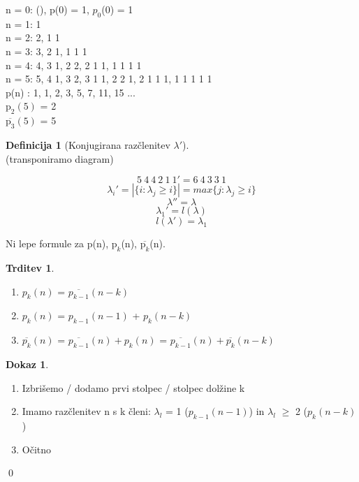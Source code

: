 \documentclass[a4paper,12pt]{article}
\theoremstyle{definition}
\newtheorem{defn}[counter]{Definicija}
\newtheorem{claim}[counter]{Trditev}
\newtheorem{pro}[counter]{Dokaz}
\theoremstyle{remark}
\begin{document}
n = 0: (), p(0) = 1, $p_0$(0) = 1\\
n = 1: 1\\
n = 2: 2, 1 1\\
n = 3: 3, 2 1, 1 1 1\\
n = 4: 4, 3 1, 2 2, 2 1 1, 1 1 1 1\\
n = 5: 5, 4 1, 3 2, 3 1 1, 2 2 1, 2 1 1 1, 1 1 1 1 1\\

p(n) : 1, 1, 2, 3, 5, 7, 11, 15 ...\\
$\text{p}_2(5)$ = 2\\
$\overline{\text{p}_3}(5)$ = 5\\

\begin{defn} [Konjugirana razčlenitev $\lambda '$]\mbox{}\\
(transponiramo diagram)

\[5 \ 4 \ 4 \ 2 \ 1 \ 1 ' = 6 \ 4 \ 3 \ 3 \ 1\]
\[\lambda_i ' = |\{i: \lambda_j \geqslant i\}| = max\{j: \lambda_j \geqslant i\}\]
\[\lambda '' = \lambda\]
\[\lambda_1 ' = l(\lambda)\]
\[l(\lambda ') = \lambda_1\]

Ni lepe formule za p(n), $\text{p}_k$(n), $\overline{\text{p}_k}$(n).
\end{defn}

\begin{claim}\mbox{}\\
\begin{enumerate}
    \item $p_k(n)$ = $\overline{p_{k - 1}} (n - k)$
    \item $p_k(n)$ = $p_{k - 1} (n - 1)$ + $p_k (n - k)$
    \item $\overline{p_{k}}(n)$ = $\overline{p_{k - 1}}(n) + p_k (n)$ = $\overline{p_{k - 1}}(n) + \overline{p_k} (n - k)$ 
\end{enumerate}
\end{claim}

\begin{pro}\mbox{}\\
    \begin{enumerate}
        \item Izbrišemo / dodamo prvi stolpec / stolpec dolžine k
        \item Imamo razčlenitev n s k členi: $\lambda_l$ = 1 ($p_{k - 1}(n - 1)$) in $\lambda_l$ $\geqslant$ 2 ($p_k(n - k)$)
        \item Očitno
    \end{enumerate}
    \qed
\end{pro}
\end{document}
